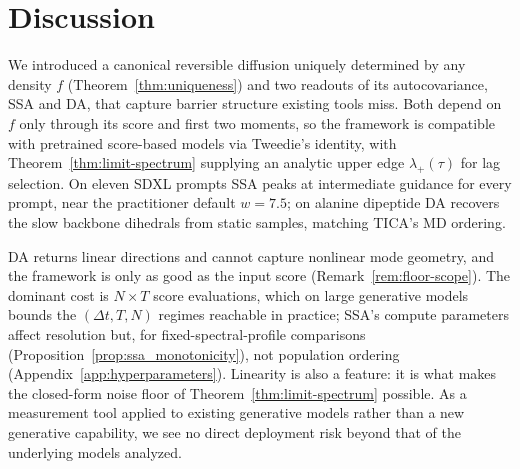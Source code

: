 \documentclass{article}
\begin{document}

\section{Discussion}
\label{sec:discussion}
\label{sec:conclusion}

We introduced a canonical reversible diffusion uniquely determined by any density $f$ (Theorem~\ref{thm:uniqueness}) and two readouts of its autocovariance, SSA and DA, that capture barrier structure existing tools miss. Both depend on $f$ only through its score and first two moments, so the framework is compatible with pretrained score-based models via Tweedie's identity, with Theorem~\ref{thm:limit-spectrum} supplying an analytic upper edge $\lambda_+(\tau)$ for lag selection. On eleven SDXL prompts SSA peaks at intermediate guidance for every prompt, near the practitioner default $w = 7.5$; on alanine dipeptide DA recovers the slow backbone dihedrals from static samples, matching TICA's MD ordering.

DA returns linear directions and cannot capture nonlinear mode
geometry, and the framework is only as good as the input score
(Remark~\ref{rem:floor-scope}). The dominant cost is $N \times T$
score evaluations, which on large generative models bounds the
$(\Delta t, T, N)$ regimes reachable in practice; SSA's compute
parameters affect resolution but, for fixed-spectral-profile comparisons (Proposition~\ref{prop:ssa_monotonicity}), not population ordering
(Appendix~\ref{app:hyperparameters}). Linearity is also a feature:
it is what makes the closed-form noise floor of
Theorem~\ref{thm:limit-spectrum} possible. As a measurement tool
applied to existing generative models rather than a new generative
capability, we see no direct deployment risk beyond that of the
underlying models analyzed. 
\end{document}
